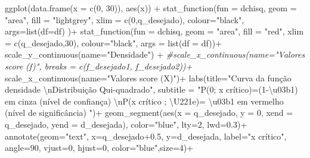 \documentclass[
]{book}
\newenvironment{Shaded}{\begin{snugshade}}{\end{snugshade}}
\newcommand{\AttributeTok}[1]{\textcolor[rgb]{0.77,0.63,0.00}{#1}}
\newcommand{\CommentTok}[1]{\textcolor[rgb]{0.56,0.35,0.01}{\textit{#1}}}
\newcommand{\DecValTok}[1]{\textcolor[rgb]{0.00,0.00,0.81}{#1}}
\newcommand{\FloatTok}[1]{\textcolor[rgb]{0.00,0.00,0.81}{#1}}
\newcommand{\FunctionTok}[1]{\textcolor[rgb]{0.00,0.00,0.00}{#1}}
\newcommand{\NormalTok}[1]{#1}
\newcommand{\SpecialCharTok}[1]{\textcolor[rgb]{0.00,0.00,0.00}{#1}}
\newcommand{\StringTok}[1]{\textcolor[rgb]{0.31,0.60,0.02}{#1}}
\begin{document}
\begin{Shaded}
\begin{Highlighting}[]
\FunctionTok{ggplot}\NormalTok{(}\FunctionTok{data.frame}\NormalTok{(}\AttributeTok{x =} \FunctionTok{c}\NormalTok{(}\DecValTok{0}\NormalTok{, }\DecValTok{30}\NormalTok{)), }\FunctionTok{aes}\NormalTok{(x)) }\SpecialCharTok{+}
  \FunctionTok{stat\_function}\NormalTok{(}\AttributeTok{fun =}\NormalTok{ dchisq,}
                \AttributeTok{geom =} \StringTok{"area"}\NormalTok{,}
                \AttributeTok{fill =} \StringTok{"lightgrey"}\NormalTok{,}
                \AttributeTok{xlim =} \FunctionTok{c}\NormalTok{(}\DecValTok{0}\NormalTok{,q\_desejado),}
                \AttributeTok{colour=}\StringTok{"black"}\NormalTok{,}
                \AttributeTok{args=}\FunctionTok{list}\NormalTok{(}\AttributeTok{df=}\NormalTok{df) )}\SpecialCharTok{+}
  \FunctionTok{stat\_function}\NormalTok{(}\AttributeTok{fun =}\NormalTok{ dchisq,}
                \AttributeTok{geom =} \StringTok{"area"}\NormalTok{,}
                \AttributeTok{fill =} \StringTok{"red"}\NormalTok{,}
                \AttributeTok{xlim =} \FunctionTok{c}\NormalTok{(q\_desejado,}\DecValTok{30}\NormalTok{),}
                \AttributeTok{colour=}\StringTok{"black"}\NormalTok{,}
                \AttributeTok{args =} \FunctionTok{list}\NormalTok{(}\AttributeTok{df =}\NormalTok{ df))}\SpecialCharTok{+}
  \FunctionTok{scale\_y\_continuous}\NormalTok{(}\AttributeTok{name=}\StringTok{"Densidade"}\NormalTok{) }\SpecialCharTok{+}
  \CommentTok{\#scale\_x\_continuous(name="Valores score (f)", breaks = c(f\_desejado1, f\_desejado2))+  }
  \FunctionTok{scale\_x\_continuous}\NormalTok{(}\AttributeTok{name=}\StringTok{"Valores score (X)"}\NormalTok{)}\SpecialCharTok{+}  
  \FunctionTok{labs}\NormalTok{(}\AttributeTok{title=}\StringTok{"Curva da função densidade }\SpecialCharTok{\textbackslash{}n}\StringTok{Distribuição Qui{-}quadrado"}\NormalTok{, }
  \AttributeTok{subtitle =} \StringTok{"P(0; x crítico)=(1{-}\textbackslash{}u03b1) em cinza (nível de confiança) }\SpecialCharTok{\textbackslash{}n}\StringTok{P(x crítico ; \textbackslash{}U221e)= \textbackslash{}u03b1 em vermelho (nível de significância) "}\NormalTok{)}\SpecialCharTok{+}
  \FunctionTok{geom\_segment}\NormalTok{(}\FunctionTok{aes}\NormalTok{(}\AttributeTok{x =}\NormalTok{ q\_desejado, }\AttributeTok{y =} \DecValTok{0}\NormalTok{, }\AttributeTok{xend =}\NormalTok{ q\_desejado, }\AttributeTok{yend =}\NormalTok{ d\_desejada), }\AttributeTok{color=}\StringTok{"blue"}\NormalTok{, }\AttributeTok{lty=}\DecValTok{2}\NormalTok{, }\AttributeTok{lwd=}\FloatTok{0.3}\NormalTok{)}\SpecialCharTok{+}
  \FunctionTok{annotate}\NormalTok{(}\AttributeTok{geom=}\StringTok{"text"}\NormalTok{, }\AttributeTok{x=}\NormalTok{q\_desejado}\FloatTok{+0.5}\NormalTok{, }\AttributeTok{y=}\NormalTok{d\_desejada, }\AttributeTok{label=}\StringTok{"x crítico"}\NormalTok{, }\AttributeTok{angle=}\DecValTok{90}\NormalTok{, }\AttributeTok{vjust=}\DecValTok{0}\NormalTok{, }\AttributeTok{hjust=}\DecValTok{0}\NormalTok{, }\AttributeTok{color=}\StringTok{"blue"}\NormalTok{,}\AttributeTok{size=}\DecValTok{4}\NormalTok{)}\SpecialCharTok{+}

\end{Highlighting}
\end{Shaded}
\end{document}
